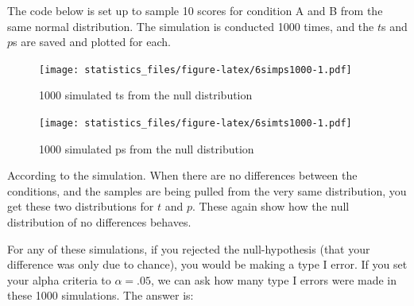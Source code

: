\documentclass[]{book}
\newenvironment{Shaded}{\begin{snugshade}}{\end{snugshade}}
\newcommand{\ControlFlowTok}[1]{\textcolor[rgb]{0.13,0.29,0.53}{\textbf{#1}}}
\newcommand{\DataTypeTok}[1]{\textcolor[rgb]{0.13,0.29,0.53}{#1}}
\newcommand{\DecValTok}[1]{\textcolor[rgb]{0.00,0.00,0.81}{#1}}
\newcommand{\KeywordTok}[1]{\textcolor[rgb]{0.13,0.29,0.53}{\textbf{#1}}}
\newcommand{\NormalTok}[1]{#1}
\newcommand{\OperatorTok}[1]{\textcolor[rgb]{0.81,0.36,0.00}{\textbf{#1}}}
\newcommand{\StringTok}[1]{\textcolor[rgb]{0.31,0.60,0.02}{#1}}
\begin{document}
The code below is set up to sample 10 scores for condition A and B from the same normal distribution. The simulation is conducted 1000 times, and the \(t\)s and \(p\)s are saved and plotted for each.

\begin{Shaded}
\end{Shaded}

\begin{figure}
\centering
\texttt{[image: statistics\_files/figure-latex/6simps1000-1.pdf]}
\caption{\label{fig:6simps1000}1000 simulated ts from the null distribution}
\end{figure}

\begin{figure}
\centering
\texttt{[image: statistics\_files/figure-latex/6simts1000-1.pdf]}
\caption{\label{fig:6simts1000}1000 simulated ps from the null distribution}
\end{figure}

According to the simulation. When there are no differences between the conditions, and the samples are being pulled from the very same distribution, you get these two distributions for \(t\) and \(p\). These again show how the null distribution of no differences behaves.

For any of these simulations, if you rejected the null-hypothesis (that your difference was only due to chance), you would be making a type I error. If you set your alpha criteria to \(\alpha = .05\), we can ask how many type I errors were made in these 1000 simulations. The answer is:
\end{document}
